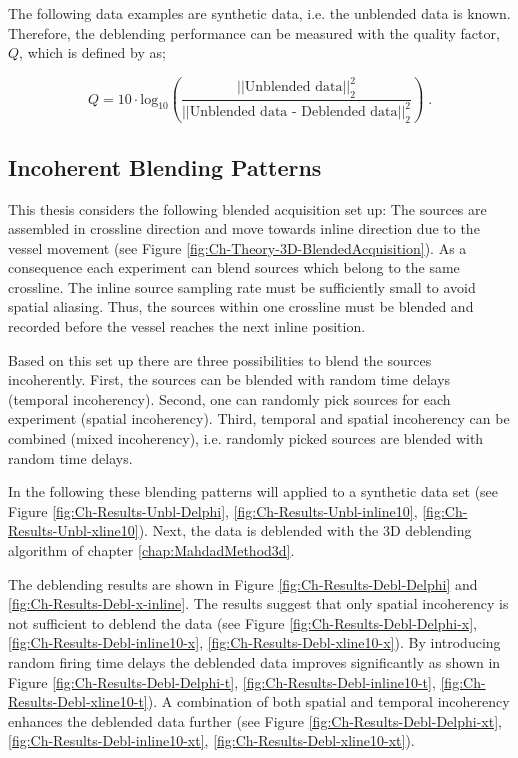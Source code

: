The following data examples are synthetic data, i.e. the unblended data is known. Therefore, the deblending performance can be measured with the quality factor, $Q$, which is defined by \citet{IbrahimQuality} as;

\begin{equation}
	Q = 10 \cdot \mathrm{log_{10}} \left( \frac{\left|\left|\text{Unblended data}\right|\right| _2 ^2}{\left|\left|\text{Unblended data - Deblended data}\right|\right| _2 ^2} \right) \;.	
\end{equation}



\subsection*{Incoherent Blending Patterns}

This thesis considers the following blended acquisition set up: The sources are assembled in crossline direction and move towards inline direction due to the vessel movement (see Figure \ref{fig:Ch-Theory-3D-BlendedAcquisition}). As a consequence each experiment can blend sources which belong to the same crossline. The inline source sampling rate must be sufficiently small to avoid spatial aliasing. Thus, the sources within one crossline must be blended and recorded before the vessel reaches the next inline position.

Based on this set up there are three possibilities to blend the sources incoherently. First, the sources can be blended with random time delays (temporal incoherency). Second, one can randomly pick sources for each experiment (spatial incoherency). Third, temporal and spatial incoherency can be combined (mixed incoherency), i.e. randomly picked sources are blended with random time delays.

In the following these blending patterns will applied to a synthetic data set (see Figure \ref{fig:Ch-Results-Unbl-Delphi}, \ref{fig:Ch-Results-Unbl-inline10}, \ref{fig:Ch-Results-Unbl-xline10}). Next, the data is deblended with the 3D deblending algorithm of chapter \ref{chap:MahdadMethod3d}. 

The deblending results are shown in Figure \ref{fig:Ch-Results-Debl-Delphi} and \ref{fig:Ch-Results-Debl-x-inline}. The results suggest that only spatial incoherency is not sufficient to deblend the data (see Figure \ref{fig:Ch-Results-Debl-Delphi-x}, \ref{fig:Ch-Results-Debl-inline10-x}, \ref{fig:Ch-Results-Debl-xline10-x}). By introducing random firing time delays the deblended data improves significantly as shown in Figure \ref{fig:Ch-Results-Debl-Delphi-t}, \ref{fig:Ch-Results-Debl-inline10-t}, \ref{fig:Ch-Results-Debl-xline10-t}). A combination of both spatial and temporal incoherency enhances the deblended data further (see Figure \ref{fig:Ch-Results-Debl-Delphi-xt}, \ref{fig:Ch-Results-Debl-inline10-xt}, \ref{fig:Ch-Results-Debl-xline10-xt}).

